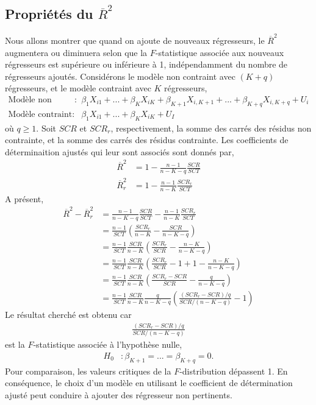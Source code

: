 \subsection{Propriétés du $\overline{R}^2$}
Nous allons montrer que quand on  ajoute de nouveaux régresseurs, le $\overline{R}^2$ augmentera ou diminuera selon que la $F$-statistique associée aux nouveaux régresseurs est supérieure ou inférieure à 1, indépendamment du nombre de régresseurs ajoutés. Considérons le modèle non contraint avec $(K+q)$ régresseurs, et le modèle contraint avec $K$ régresseurs,
\begin{align*}
\textrm{Modèle non contraint}: & \beta_1X_{i1} + ...+\beta_KX_{iK} + \beta_{K+1}X_{i,K+1} +  ...+\beta_{K+q}X_{i,K+q} + U_i\\
\textrm{Modèle contraint}: &  \beta_1X_{i1} +...+\beta_KX_{iK} + U_I
\end{align*}
où $q\geq 1$. Soit $SCR$ et $SCR_r$, respectivement, la somme des carrés des résidus non contrainte, et la somme des carrés des résidus contrainte. Les coefficients de déterminaition ajustés qui leur sont associés sont donnés par,
\begin{align*}
\overline{R}^2 &= 1 - \frac{n-1}{n-K-q}\frac{SCR}{SCT}\\
\overline{R}^2_r &= 1 - \frac{n-1}{n-K}\frac{SCR_r}{SCT}
\end{align*}
A présent,
\begin{align*}
\overline{R}^2 - \overline{R}^2_r &= \frac{n-1}{n-K-q}\frac{SCR}{SCT} - \frac{n-1}{n-K}\frac{SCR_r}{SCT}\\
&= \frac{n-1}{SCT}\left(\frac{SCR_r}{n-K} - \frac{SCR}{n-K-q}\right)\\
&=\frac{n-1}{SCT}\frac{SCR}{n-K}\left(\frac{SCR_r}{SCR} - \frac{n-K}{n-K-q}\right)\\
&=\frac{n-1}{SCT}\frac{SCR}{n-K}\left(\frac{SCR_r}{SCR} -1+1- \frac{n-K}{n-K-q}\right)\\
&=\frac{n-1}{SCT}\frac{SCR}{n-K}\left(\frac{SCR_r - SCR}{SCR} - \frac{q}{n-K-q}\right)\\
&=\frac{n-1}{SCT}\frac{SCR}{n-K} \frac{q}{n-K-q}\left(\frac{(SCR_r - SCR)/q}{SCR/(n-K-q)} - 1\right)
\end{align*}
Le résultat cherché est obtenu car 
\begin{align*} 
\frac{(SCR_r - SCR)/q}{SCR/(n-K-q)}
\end{align*}
est la $F$-statistique associée à l'hypothèse nulle,
\begin{align*}
H_0&:\beta_{K+1}=...=\beta_{K+q}=0.
\end{align*}
Pour comparaison, les valeurs critiques de la $F$-distribution dépassent 1. En conséquence, le choix d'un  modèle en utilisant le coefficient de détermination ajusté peut conduire à ajouter des régresseur non pertinents.


